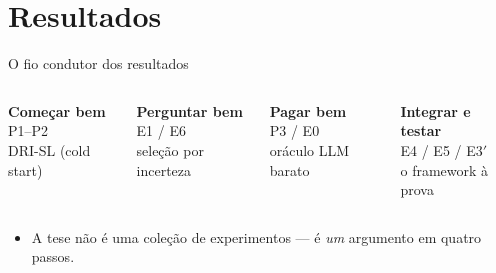 \documentclass[aspectratio=169,11pt]{beamer}
\begin{document}
\section{Resultados}
\begin{frame}{O fio condutor dos resultados}
\vspace{0.5em}
\begin{columns}[T]
\centering
\colorbox{ufprgreen!12}{\parbox[t][2.2cm][t]{\linewidth}{\centering\textbf{Começar bem}\\[2pt]\footnotesize P1--P2\\ DRI-SL (cold start)}}
\centering
\colorbox{ufprgreen!12}{\parbox[t][2.2cm][t]{\linewidth}{\centering\textbf{Perguntar bem}\\[2pt]\footnotesize E1 / E6\\ seleção por incerteza}}
\centering
\colorbox{ufprgreen!12}{\parbox[t][2.2cm][t]{\linewidth}{\centering\textbf{Pagar bem}\\[2pt]\footnotesize P3 / E0\\ oráculo LLM barato}}
\centering
\colorbox{ufprgreen!12}{\parbox[t][2.2cm][t]{\linewidth}{\centering\textbf{Integrar e testar}\\[2pt]\footnotesize E4 / E5 / E3$'$\\ o framework à prova}}
\end{columns}
\vspace{1.2em}
\vspace{0.8em}
\begin{itemize}\footnotesize
  \item A tese não é uma coleção de experimentos --- é \emph{um} argumento em quatro passos.
\end{itemize}
\end{frame}
\end{document}
